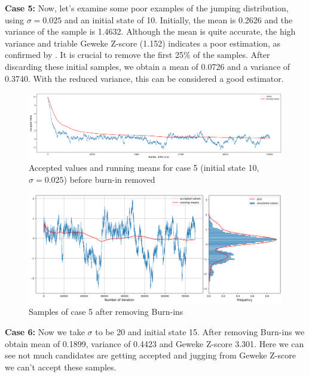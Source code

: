 \begin{example}
	\textbf{Case 5:}  Now, let's examine some poor examples of the jumping distribution, using $\sigma = 0.025$ and an initial state of 10. Initially, the mean is 0.2626 and the variance of the sample is 1.4632. Although the mean is quite accurate, the high variance and triable Geweke Z-score (1.152) indicates a poor estimation, as confirmed by . It is crucial to remove the first 25\% of the samples. After discarding these initial samples, we obtain a mean of 0.0726 and a variance of 0.3740. With the reduced variance, this can be considered a good estimator.

	\begin{figure}[H]
		\centering
		\includegraphics[width=1\textwidth]{./images/metropolis/example1/sample-5-values.png}
		\caption{Accepted values and running means for case 5 (initial state 10, $ \sigma = 0.025 $) before burn-in removed}
		\label{fig:MH sample5}
	\end{figure}

	\begin{figure}[H]
		\centering
		\includegraphics[width=1\textwidth]{./images/metropolis/example1/sample-5-value-hist-bo.png}
		\caption{Samples of case 5 after removing Burn-ins}
	\end{figure}

	\textbf{Case 6:} Now we take $ \sigma $ to be 20 and initial state 15. After removing Burn-ins we obtain mean of 0.1899, variance of 0.4423 and Geweke Z-score 3.301. Here we can see not much candidates are getting accepted and jugging from Geweke Z-score we can't accept these samples.


\end{example}
